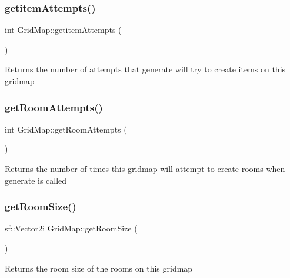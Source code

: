 \subsubsection{\texorpdfstring{getitem\+Attempts()}{getitemAttempts()}}
{\footnotesize\ttfamily int Grid\+Map\+::getitem\+Attempts (\begin{DoxyParamCaption}{ }\end{DoxyParamCaption})}

\begin{DoxyReturn}{Returns}
the number of attempts that generate will try to create items on this gridmap 
\end{DoxyReturn}
\mbox{\label{classGridMap_a3eae29defbaa295560dc9eac799da463}} 
\subsubsection{\texorpdfstring{get\+Room\+Attempts()}{getRoomAttempts()}}
{\footnotesize\ttfamily int Grid\+Map\+::get\+Room\+Attempts (\begin{DoxyParamCaption}{ }\end{DoxyParamCaption})}

\begin{DoxyReturn}{Returns}
the number of times this gridmap will attempt to create rooms when generate is called 
\end{DoxyReturn}
\mbox{\label{classGridMap_ad7f5bca4ce7d107bcf1dc152b7087b30}} 
\subsubsection{\texorpdfstring{get\+Room\+Size()}{getRoomSize()}}
{\footnotesize\ttfamily sf\+::\+Vector2i Grid\+Map\+::get\+Room\+Size (\begin{DoxyParamCaption}{ }\end{DoxyParamCaption})}

\begin{DoxyReturn}{Returns}
the room size of the rooms on this gridmap 
\end{DoxyReturn}
\mbox{\label{classGridMap_a16201950aec7a6161426c99cf684e656}} 
